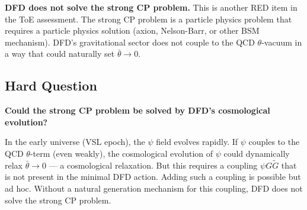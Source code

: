 \documentclass[11pt,a4paper]{article}
\begin{document}
\textbf{DFD does not solve the strong CP problem.} This is another RED item in the ToE assessment. The strong CP problem is a particle physics problem that requires a particle physics solution (axion, Nelson-Barr, or other BSM mechanism). DFD's gravitational sector does not couple to the QCD $\theta$-vacuum in a way that could naturally set $\bar\theta \to 0$.

\subsection{Hard Question}

\textbf{Could the strong CP problem be solved by DFD's cosmological evolution?}

In the early universe (VSL epoch), the $\psi$ field evolves rapidly. If $\psi$ couples to the QCD $\theta$-term (even weakly), the cosmological evolution of $\psi$ could dynamically relax $\bar\theta \to 0$ --- a cosmological relaxation. But this requires a coupling $\psi G\tilde{G}$ that is not present in the minimal DFD action. Adding such a coupling is possible but ad hoc. Without a natural generation mechanism for this coupling, DFD does not solve the strong CP problem.
\end{document}
